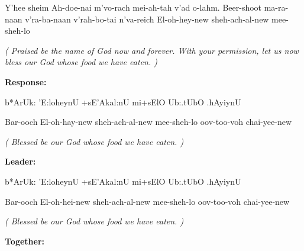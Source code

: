 \documentclass[12pt]{article}
\newenvironment{hebrewPrayer}
    {\begin{cjhebrew}
     \Large
    }
    { 
    \end{cjhebrew}
    }
\newenvironment{hebrewTransliteration}{}{\par}
\newenvironment{unreadHebrewTranslation}{\itshape(\hspace{-0.2em}}{\hspace{-0.2em})\par}
\newcommand{\god}{God}
\newcommand{\hebrewVowelOh}{\textrm{\hspace{0.2em}}o\textrm{\hspace{-0.2em}}}
\newcommand{\transliterateAdonai}{Ah-doe-nai}
\begin{document}
\begin{hebrewTransliteration}
    Y'hee sheim {\transliterateAdonai} m'vo-rach mei-ah-tah v'ad o-lahm. Beer-shoot ma-ra-naan v'ra-ba-naan v'rah-bo-tai n'va-reich El-oh-hey-new sheh-ach-al-new mee-sheh-lo
\end{hebrewTransliteration}

\begin{unreadHebrewTranslation}
    Praised be the name of {\god} now and forever. With your permission, let us now bless our {\god} whose food we have eaten.
\end{unreadHebrewTranslation}


\textbf{Response:}

\begin{hebrewPrayer}
    b*ArUk: 'E:l{\hebrewVowelOh}heynU +sE'Akal:nU mi+sElO Ub:.tUbO .hAyiynU
\end{hebrewPrayer}

\begin{hebrewTransliteration}
    Bar-ooch El-oh-hay-new sheh-ach-al-new mee-sheh-lo oov-too-voh chai-yee-new
\end{hebrewTransliteration}

\begin{unreadHebrewTranslation}
    Blessed be our {\god} whose food we have eaten.
\end{unreadHebrewTranslation}

\textbf{Leader:}

\begin{hebrewPrayer}
    b*ArUk: 'E:l{\hebrewVowelOh}heynU +sE'Akal:nU mi+sElO Ub:.tUbO .hAyiynU
\end{hebrewPrayer}

\begin{hebrewTransliteration}
    Bar-ooch El-oh-hei-new sheh-ach-al-new mee-sheh-lo oov-too-voh chai-yee-new
\end{hebrewTransliteration}

\begin{unreadHebrewTranslation}
    Blessed be our {\god} whose food we have eaten.
\end{unreadHebrewTranslation}



\textbf{Together:}
\end{document}
